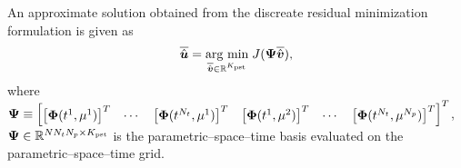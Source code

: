 \documentclass[3p,computermodern,10pt]{elsarticle}
\begin{document}
An approximate solution obtained from the discreate residual minimization formulation is given as
\begin{equation}\label{eq:discrete_minimization_principle_solution}
\overline{\hat{\boldsymbol u}} = \underset{\overline{\hat{\boldsymbol v}} \in \mathbb{R}^{K_{\text{pst}}} }{\text{arg min} } \; J( \mathbf{ \Psi} \overline{\hat{\boldsymbol v}}),
\end{equation}
where $\mathbf{ \Psi} \equiv \begin{bmatrix} \left[ \boldsymbol \Phi(t^1,\mathbf{\mu}^1)\right]^T & \cdots & \left[\boldsymbol \Phi(t^{N_t},\mathbf{\mu}^1) \right]^T & \left[ \boldsymbol \Phi(t^1,\mathbf{\mu}^2) \right]^T & \cdots & \left[\boldsymbol \Phi(t^{N_t},\mathbf{\mu}^{N_p}) \right]^T \end{bmatrix}^T$, $\mathbf{ \Psi}  \in \mathbb{R}^{N N_t N_p \times K_{\text{pst}}}$ is the parametric--space--time basis evaluated on the parametric--space--time grid.

\end{document}
